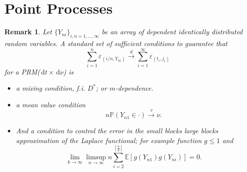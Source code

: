 \documentclass[11pt,reqno]{amsart}
\newcommand{\E}{\mathbb{E}}
\renewcommand{\P}{\mathbb{P}}
\newcommand{\1}{\mathds{1}}
\newcommand{\0}{\boldsymbol{0}}
\newcommand{\dint}{\,\mathrm{d}}
\newcommand{\vep}{\varepsilon}
\newcommand{\4}{\mathchoice{\mskip1.5mu}{\mskip1.5mu}{}{}}
\newcommand{\5}{\mathchoice{\mskip-1.5mu}{\mskip-1.5mu}{}{}}
\newcommand{\2}{\penalty250\mskip\thickmuskip\mskip-\thinmuskip} %
\newtheorem{remark}[lemma]{Remark}
\newcommand{\cid}{\stackrel{d}{\rightarrow}}
\begin{document}
\section{Point Processes}

\begin{remark}
Let $\{Y_{ni}\}_{i,n=1,\ldots,\infty}$ be an array of dependent identically distributed random variables. A standard set of sufficient conditions to guarantee that
\begin{equation*}
\sum_{i=1}^n \vep_{(i/n,Y_{ni})} \cid \sum_{i=1}^\infty \vep_{(t_i,j_i)}
\end{equation*}
for a PRM($\dint t \times \dint \nu$) is
\begin{itemize}
\item a mixing condition, f.i. $D^*$; or $m$-dependence.
\item a mean value condition 
\begin{equation*}
n \P(Y_{n1}\in \cdot)\stackrel{v}{\rightarrow}\nu.
\end{equation*}
\item And a condition to control the error in the small blocks large blocks approximation of the Laplace functional; for example function $g\leq 1$ and
\begin{equation*}
\lim_{k\to \infty} \limsup_{n\to \infty} n \sum_{i=2}^{[\frac{n}{k}]}\E[g(Y_{n1})g(Y_{ni})] =0.
\end{equation*}
\end{itemize}
\end{remark}
\end{document}

